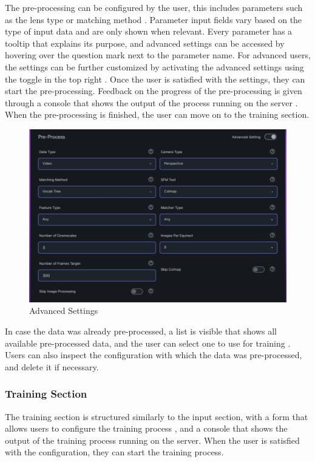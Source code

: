 The pre-processing can be configured by the user, this includes parameters such as the lens type or matching method .
Parameter input fields vary based on the type of input data and are only shown when relevant.
Every parameter has a tooltip that explains its purpose, and advanced settings can be accessed by hovering over the question mark next to the parameter name.
For advanced users, the settings can be further customized by activating the advanced settings using the toggle in the top right .
Once the user is satisfied with the settings, they can start the pre-processing.
Feedback on the progress of the pre-processing is given through a console that shows the output of the process running on the server .
When the pre-processing is finished, the user can move on to the training section.

\begin{figure}[h!]
  \centering
  \includegraphics[width=.7\textwidth]{figures/view-extended-options.png}
  \caption{Advanced Settings}
  \label{fig:design:advanced-settings}
\end{figure}

In case the data was already pre-processed, a list is visible that shows all available pre-processed data, and the user can select one to use for training .
Users can also inspect the configuration with which the data was pre-processed, and delete it if necessary.

\subsubsection*{Training Section}

The training section is structured similarly to the input section, with a form that allows users to configure the training process , and a console that shows the output of the training process running on the server.
When the user is satisfied with the configuration, they can start the training process.

